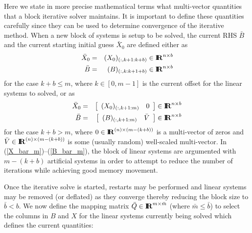 \documentclass[pdf,ps2pdf,11pt]{SANDreport}
\begin{document}
Here we state in more precise mathematical terms what multi-vector
quantities that a block iterative solver maintains.  It is important
to define these quantities carefully since they can be used to
determine convergence of the iterative method.  When a new block of
systems is setup to be solved, the current RHS $\bar{B}$ and the
current starting initial guess $\bar{X}_0$ are defined either as
%
\begin{eqnarray}
\bar{X}_0 & = & (X_0)_{(:,k+1:k+b)} \in \RE^{n \times b} \label{X_bar_r_b} \\
\bar{B}   & = & (B)_{(:,k:k+1+b)} \in \RE^{n \times b} \label{B_bar_r_b}
\end{eqnarray}
%
{}\noindent{}for the case $k+b {}\leq m$, where $k\in[0,m-1]$ is the
current offset for the linear systems to solved, or as
%
\begin{eqnarray}
\bar{X}_0 & = & {\bmat{cc} (X_0)_{(:,k+1:m)} & 0 \emat} \in \RE^{n \times b} \label{X_bar_m} \\
\bar{B}   & = & {\bmat{cc} (B)_{(:,k+1:m)} & \bar{V} \emat} \in \RE^{n \times b} \label{B_bar_m}
\end{eqnarray}
%
{}\noindent{}for the case $k+b > m$, where $0\in\RE^{(n) {}\times
(m-(k+b))}$ is a multi-vector of zeros and $\bar{V}\in\RE^{(n) {}\times
(m-(k+b))}$ is some (usually random) well-scaled multi-vector.  In
(\ref{X_bar_m})--(\ref{B_bar_m}), the block of linear systems are
argumented with $m-(k+b)$ artificial systems in order to attempt to
reduce the number of iterations while achieving good memory movement.

Once the iterative solve is started, restarts may be performed and
linear systems may be removed (or deflated) as they converge thereby
reducing the block size to $\bar{b} < b$.  We now define the mapping
matrix $\bar{Q}\in\RE^{m {}\times {}\bar{m}}$ (where $\bar{m} {}\leq
\bar{b}$) to select the columns in $B$ and $X$ for the linear systems
currently being solved which defines the current quantities:
\end{document}
